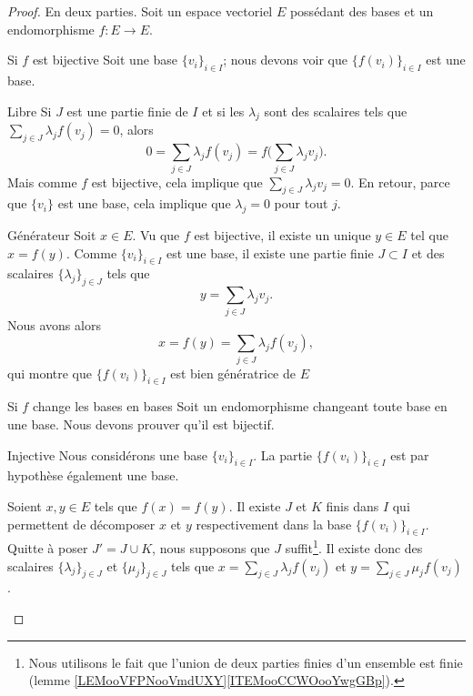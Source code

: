 \begin{proof}
	En deux parties. Soit un espace vectoriel \( E\) possédant des bases et un endomorphisme \( f\colon E\to E\).
	\begin{subproof}
		\item[Si \( f\) est bijective]
		Soit une base \( \{ v_i \}_{i\in I}\); nous devons voir que \( \{ f(v_i) \}_{i\in I}\) est une base.
		\begin{subproof}
			\item[Libre]
			Si \( J\) est une partie finie de \( I\) et si les \( \lambda_j\) sont des scalaires tels que \( \sum_{j\in J}\lambda_jf(v_j)=0\), alors
			\begin{equation}
				0=\sum_{j\in J}\lambda_jf(v_j)=f\big( \sum_{j\in J}\lambda_jv_j \big).
			\end{equation}
			Mais comme \( f\) est bijective, cela implique que \( \sum_{j\in J}\lambda_jv_j=0\). En retour, parce que \( \{ v_i \}\) est une base, cela implique que \( \lambda_j=0\) pour tout \( j\).
			\item[Générateur]
			Soit \( x\in E\). Vu que \( f\) est bijective, il existe un unique \( y\in E\) tel que \( x=f(y)\). Comme \( \{ v_i \}_{i\in I}\) est une base, il existe une partie finie \( J\subset I\) et des scalaires \( \{ \lambda_j \}_{j\in J}\) tels que
			\begin{equation}
				y=\sum_{j\in J}\lambda_jv_j.
			\end{equation}
			Nous avons alors
			\begin{equation}
				x=f(y)=\sum_{j\in J}\lambda_jf(v_j),
			\end{equation}
			qui montre que \( \{ f(v_i) \}_{i\in I}\) est bien génératrice de \( E\)
		\end{subproof}
		\item[Si \( f\) change les bases en bases]
		Soit un endomorphisme changeant toute base en une base. Nous devons prouver qu'il est bijectif.
		\begin{subproof}
			\item[Injective]
			Nous considérons une base \( \{ v_i \}_{i\in I}\). La partie \( \{ f(v_i) \}_{i\in I}\) est par hypothèse également une base.

			Soient \( x,y\in E\) tels que \( f(x)=f(y)\). Il existe \( J\) et \( K\) finis dans \( I\) qui permettent de décomposer \( x\) et \( y\) respectivement dans la base \( \{ f(v_i) \}_{i\in I}\). Quitte à poser \( J'=J\cup K\), nous supposons que \( J\) suffit\footnote{Nous utilisons le fait que l'union de deux parties finies d'un ensemble est finie (lemme \ref{LEMooVFPNooVmdUXY}\ref{ITEMooCCWOooYwgGBp}).}. Il existe donc des scalaires \( \{ \lambda_j \}_{j\in J}\) et \( \{ \mu_j \}_{j\in J}\) tels que \( x=\sum_{j\in J}\lambda_jf(v_j)\) et \( y=\sum_{j\in J}\mu_jf(v_j)\).


\end{subproof}
\end{subproof}
\end{proof}
